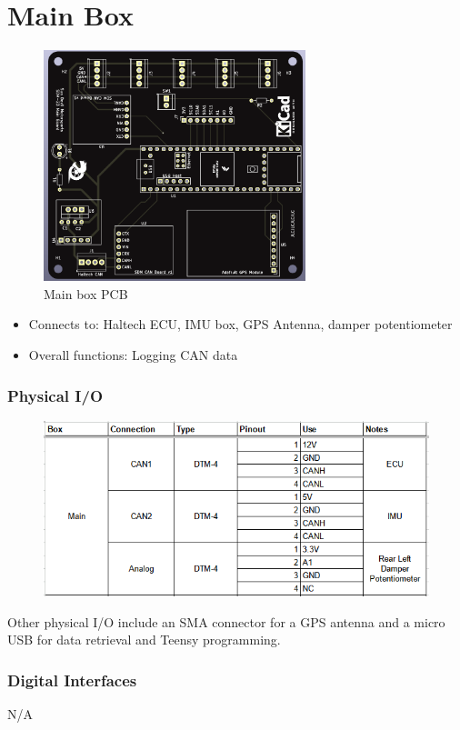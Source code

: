 \section{Main Box}
\begin{figure}[H]
    \centering
    \includegraphics[width=3in]{images/pcbmain.png}
    \caption{Main box PCB}
    \label{fig:pcbmain}
\end{figure}
\begin{itemize}
    \item Connects to: Haltech ECU, IMU box, GPS Antenna, damper potentiometer
    \item Overall functions: Logging CAN data
\end{itemize}
\subsubsection{Physical I/O}
\begin{figure}[H]
    \centering
    \includegraphics[width=7in]{images/piomain.png}
\end{figure}
Other physical I/O include an SMA connector for a GPS antenna and a micro USB for data retrieval and Teensy programming.
\subsubsection{Digital Interfaces}
N/A

